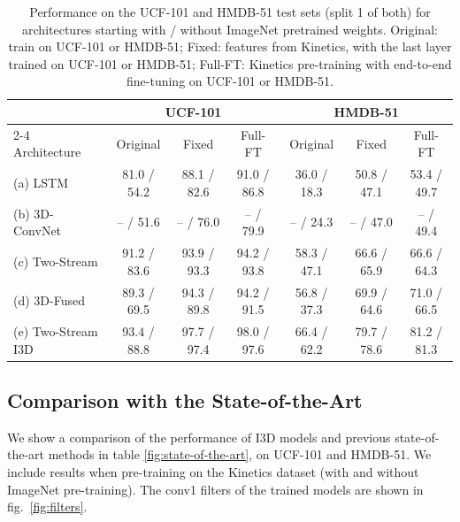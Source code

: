 \documentclass[10pt,twocolumn,letterpaper]{article}
\begin{document}
\begin{table}[h]
\begin{center}
    \begin{tabular}{| l | c | c | c || c | c | c|}
    \hline
 &  \multicolumn{3}{|c||}{UCF-101} &  \multicolumn{3}{c|}{HMDB-51}  \\ \cline{2-4} \cline{5-7} 
Architecture & Original   & Fixed & Full-FT & Original   & Fixed & Full-FT  \\ \hline \hline
    (a) LSTM            & 81.0 / 54.2 & 88.1 / 82.6 & 91.0 / 86.8 & 36.0 / 18.3 & 50.8 / 47.1  & 53.4 / 49.7  \\ \hline
    (b) 3D-ConvNet      & -- / 51.6 & -- / 76.0 & -- / 79.9 & -- / 24.3 & -- / 47.0  & -- / 49.4            \\ \hline
    (c) Two-Stream     & 91.2 / 83.6 & 93.9 / 93.3 & 94.2 / 93.8 & 58.3 /  47.1 & 66.6 / 65.9 &  66.6 / 64.3 \\ \hline
    (d) 3D-Fused       & 89.3 / 69.5 & 94.3 / 89.8 & 94.2 / 91.5 & 56.8 / 37.3 & 69.9 / 64.6 & 71.0 / 66.5           \\ \hline \hline
    (e) Two-Stream I3D & 93.4 / 88.8 & 97.7 / 97.4 & 98.0 / 97.6 & 66.4 / 62.2 & 79.7 / 78.6 &  81.2 / 81.3    \\ \hline
    \hline
    \end{tabular}
\end{center}
\caption{Performance on the UCF-101 and HMDB-51 test sets (split 1 of both) for architectures starting with / without ImageNet pretrained weights. Original: train on UCF-101 or HMDB-51; Fixed: features from Kinetics, with the last layer trained on UCF-101 or HMDB-51; Full-FT: Kinetics pre-training with end-to-end fine-tuning on UCF-101 or HMDB-51.}
\label{fig:transferUCFHDMI}
\end{table}


\subsection{Comparison with the State-of-the-Art}

We show a comparison of the performance of I3D models and previous
state-of-the-art methods in table \ref{fig:state-of-the-art}, on
UCF-101 and HMDB-51. We include results when pre-training on
the Kinetics dataset (with and without ImageNet pre-training). The conv1 filters of
the trained models are shown in fig.~\ref{fig:filters}.
\end{document}
